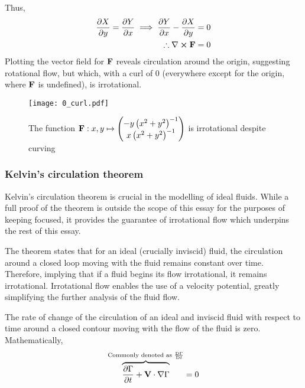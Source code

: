 Thus,
\begin{align*}
    \pdv{X}{y}=\pdv{Y}{x}\implies\pdv{Y}{x}-\pdv{X}{y}=0\\
    \therefore\curl{\fatf}=0
\end{align*}
Plotting the vector field for $\mathbf{F}$ reveals circulation around the origin, suggesting rotational flow, but which, with a curl of 0 (everywhere except for
the origin, where $\mathbf{F}$ is undefined), is irrotational.
\begin{figure*}[!ht]
    \texttt{[image: 0\_curl.pdf]}
    \centering
    \caption{The function $\mathbf{F}:x,y\mapsto\begin{pmatrix}
        -y\left(x^2+y^2\right)^{-1}\\x\left(x^2+y^2\right)^{-1}
    \end{pmatrix}$ is irrotational despite curving}
    \label{figure:ZEROCURL}
\end{figure*}

\subsubsection{Kelvin's circulation theorem}\label{section:KELVIN}
Kelvin's circulation theorem is crucial in the modelling of ideal fluids. While a full proof of the theorem is outside the scope of this essay for the purposes
of keeping focused, it provides the guarantee of irrotational flow which underpins the rest of this essay.

The theorem states that for an ideal (crucially inviscid) fluid, the circulation around a closed loop moving with the fluid remains constant over time. Therefore,
implying that if a fluid begins its flow irrotational, it remains irrotational. Irrotational flow enables the use of a velocity potential,
greatly simplifying the further analysis of the fluid flow.
\begin{theorem}\label{lemma:KELVIN}
    The rate of change of the circulation of an ideal and inviscid fluid with respect to time around a closed contour moving with the flow of the fluid is zero. Mathematically,
    $$
        \overbrace{\pdv{\Gamma}{t}+\mathbf{V}\cdot\nabla\Gamma}^{\text{Commonly denoted as }\frac{\mathrm{D} \Gamma}{\mathrm{D} t}}=0
    $$
\end{theorem}

\newpage %
